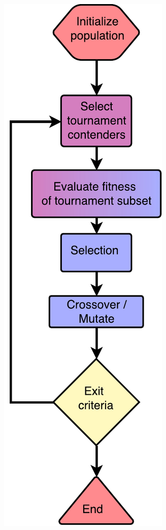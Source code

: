 \begin{figure}[ht]
\begin{subfigure}[ht]{0.25\linewidth}
    \end{subfigure}
    \hspace{0.25\textwidth}
    \begin{subfigure}[ht]{0.25\linewidth}
        \includegraphics[width=\linewidth]{Chapters/2.Background/figures/tournamentsearch_flowchart.pdf}

\end{subfigure}
\end{figure}
